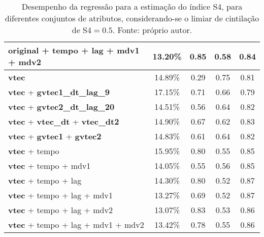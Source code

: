 \begin{table}
\begin{center}
\begin{tabular}{|l|c|c|c|c|}
original + tempo + lag + mdv1 + mdv2            & 13.20\%  &  0.85  &  0.58  &  0.84 \\ \hline
{\bf vtec}                                      & 14.89\%  &  0.29  &  0.75  &  0.81 \\ \hline
{\bf vtec} + {\bf gvtec1\_dt\_lag\_9}           & 17.15\%  &  0.71  &  0.66  &  0.79 \\ \hline
{\bf vtec} + {\bf gvtec2\_dt\_lag\_20}          & 14.51\%  &  0.56  &  0.64  &  0.82 \\ \hline
{\bf vtec} + {\bf vtec\_dt} + {\bf vtec\_dt2}   & 14.90\%  &  0.67  &  0.62  &  0.83 \\ \hline
{\bf vtec} + {\bf gvtec1} + {\bf gvtec2}        & 14.83\%  &  0.61  &  0.64  &  0.82 \\ \hline
{\bf vtec} + tempo                              & 15.95\%  &  0.80  &  0.55  &  0.85 \\ \hline
{\bf vtec} + tempo + mdv1                       & 14.05\%  &  0.55  &  0.56  &  0.85 \\ \hline
{\bf vtec} + tempo + lag                        & 14.30\%  &  0.80  &  0.52  &  0.87 \\ \hline
{\bf vtec} + tempo + lag + mdv1                 & 13.27\%  &  0.69  &  0.52  &  0.87 \\ \hline
{\bf vtec} + tempo + lag + mdv2                 & 13.07\%  &  0.83  &  0.53  &  0.86 \\ \hline
{\bf vtec} + tempo + lag + mdv1 + mdv2          & 13.42\%  &  0.78  &  0.55  &  0.86 \\ \hline
\end{tabular}
\end{center}
\vspace{12pt}
\caption{Desempenho da regressão para a estimação do índice S4, para diferentes conjuntos de atributos, considerando-se o limiar de cintilação de S4$=0.5$. Fonte: próprio autor.}
\label{tab:final_result1}
\end{table}

